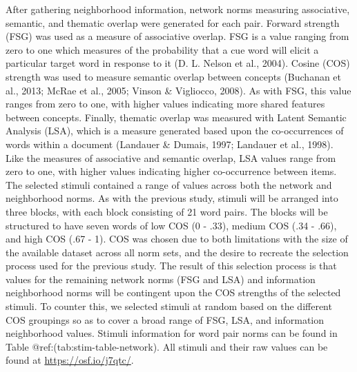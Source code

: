 \documentclass[english,man]{apa6}
\theoremstyle{definition}
\theoremstyle{definition}
\theoremstyle{definition}
\theoremstyle{remark}
\begin{document}
After gathering neighborhood information, network norms measuring
associative, semantic, and thematic overlap were generated for each
pair. Forward strength (FSG) was used as a measure of associative
overlap. FSG is a value ranging from zero to one which measures of the
probability that a cue word will elicit a particular target word in
response to it (D. L. Nelson et al., 2004). Cosine (COS) strength was
used to measure semantic overlap between concepts (Buchanan et al.,
2013; McRae et al., 2005; Vinson \& Vigliocco, 2008). As with FSG, this
value ranges from zero to one, with higher values indicating more shared
features between concepts. Finally, thematic overlap was measured with
Latent Semantic Analysis (LSA), which is a measure generated based upon
the co-occurrences of words within a document (Landauer \& Dumais, 1997;
Landauer et al., 1998). Like the measures of associative and semantic
overlap, LSA values range from zero to one, with higher values
indicating higher co-occurrence between items. The selected stimuli
contained a range of values across both the network and neighborhood
norms. As with the previous study, stimuli will be arranged into three
blocks, with each block consisting of 21 word pairs. The blocks will be
structured to have seven words of low COS (0 - .33), medium COS (.34 -
.66), and high COS (.67 - 1). COS was chosen due to both limitations
with the size of the available dataset across all norm sets, and the
desire to recreate the selection process used for the previous study.
The result of this selection process is that values for the remaining
network norms (FSG and LSA) and information neighborhood norms will be
contingent upon the COS strengths of the selected stimuli. To counter
this, we selected stimuli at random based on the different COS groupings
so as to cover a broad range of FSG, LSA, and information neighborhood
values. Stimuli information for word pair norms can be found in Table
@ref:(tab:stim-table-network). All stimuli and their raw values can be
found at \url{https://osf.io/j7qtc/}.
\end{document}
